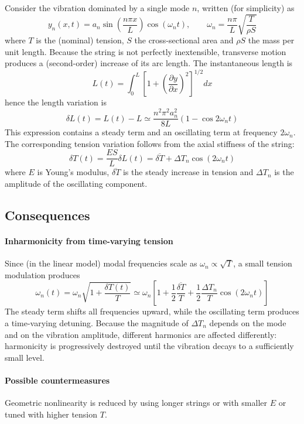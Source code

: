 Consider the vibration dominated by a single mode \( n \), written (for simplicity) as
\[
y_n(x,t) = a_n\sin\left(\frac{n\pi x}{L}\right)\cos(\omega_n t),
\qquad
\omega_n = \frac{n\pi}{L}\sqrt{\frac{T}{\rho S}}
\]
where \( T \) is the (nominal) tension, \( S \) the cross-sectional area and \( \rho S \) the mass per unit length. Because the string is not perfectly inextensible, transverse motion produces a (second-order) increase of its arc length. The instantaneous length is
\[
L(t) = \int_{0}^{L}\left[1 + \left(\frac{\partial y}{\partial x}\right)^2\right]^{1/2}dx
\]
hence the length variation is
\[
\delta L(t) = L(t)-L
\simeq
\frac{n^{2}\pi^{2}a_n^{2}}{8L}\left(1-\cos 2\omega_n t\right)
\]
This expression contains a steady term and an oscillating term at frequency \( 2\omega_n \). The corresponding tension variation follows from the axial stiffness of the string:
\[
\delta T(t) = \frac{ES}{L}\delta L(t)
 = 
\overline{\delta T} + \Delta T_n\cos(2\omega_n t)
\]
where \( E \) is Young's modulus, \( \overline{\delta T} \) is the steady increase in tension and \( \Delta T_n \) is the amplitude of the oscillating component.

\subsection{Consequences}

\paragraph{Inharmonicity from time-varying tension} Since (in the linear model) modal frequencies scale as \( \omega_n\propto \sqrt{T} \), a small tension modulation produces
\[
\omega_n(t)
 = 
\omega_n\sqrt{1 + \frac{\delta T(t)}{T}}
\simeq
\omega_n\left[1 + \frac{1}{2}\frac{\overline{\delta T}}{T}
 + \frac{1}{2}\frac{\Delta T_n}{T}\cos(2\omega_n t)\right]
\]
The steady term shifts all frequencies upward, while the oscillating term produces a time-varying detuning. Because the magnitude of \( \Delta T_n \) depends on the mode and on the vibration amplitude, different harmonics are affected differently: harmonicity is progressively destroyed until the vibration decays to a sufficiently small level.

\paragraph{Possible countermeasures} Geometric nonlinearity is reduced by using longer strings or with smaller \( E \) or tuned with higher tension \( T \).

